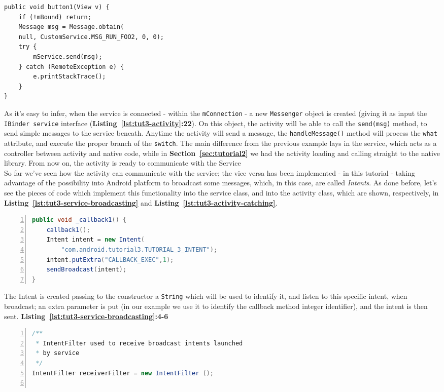 \documentclass[a4paper,10pt]{article}
\newcommand{\keyword}[1]{\texttt{#1}}
\newcommand{\refl}[1]{\textbf{Listing~\ref{#1}}}
\newcommand{\refs}[1]{\textbf{Section~\ref{#1}}}
\begin{document}
\begin{multicols}{2}
\begin{lstlisting}
public void button1(View v) {
	if (!mBound) return;
	Message msg = Message.obtain(
	null, CustomService.MSG_RUN_FOO2, 0, 0);
	try {
		mService.send(msg);
	} catch (RemoteException e) {
		e.printStackTrace();
	}
}
\end{lstlisting}
As it's easy to infer, when the service is connected - within the
\keyword{mConnection} - a new \keyword{Messenger} object is created (giving it
as input the \keyword{IBinder service} interface
(\refl{lst:tut3-activity}\textbf{:22}). On this object, the activity will be
able to call the \keyword{send(msg)} method, to send simple messages to the
service beneath. Anytime the activity will send a message, the
\keyword{handleMessage()} method will process the \keyword{what} attribute, and
execute the proper branch of the \keyword{switch}. The main difference from the
previous example lays in the service, which acts as a controller between
activity and native code, while in \refs{sec:tutorial2} we had the activity
loading and calling straight to the native library. From now on, the activity
is ready to communicate with the Service\\
So far we've seen how the activity can communicate with the service; the vice
versa has been implemented - in this tutorial - taking advantage of the
possibility into Android platform to broadcast some messages, which, in this
case, are called \textit{Intents}. As done before, let's see the pieces of code
which implement this functionality into the service class, and into the activity
class, which are shown, respectively, in \refl{lst:tut3-service-broadcasting}
and \refl{lst:tut3-activity-catching}.
\begin{lstlisting}[language=Java,
		   columns=fullflexible,
		   showstringspaces=false,
		   xleftmargin=15pt,
		   frame = l,
		   numbers=left,
		   commentstyle=\color{gray}\upshape,
		   caption=Tutorial3Service.java - intent broadcasting,
		   label=lst:tut3-service-broadcasting]
public void _callback1() {
	callback1();
	Intent intent = new Intent(
		"com.android.tutorial3.TUTORIAL_3_INTENT");
	intent.putExtra("CALLBACK_EXEC",1);
	sendBroadcast(intent);
}
\end{lstlisting}
The Intent is created passing to the constructor a \keyword{String} which will
be used to identify it, and listen to this specific intent, when broadcast; an
extra parameter is put (in our example we use it to identify the callback method
integer identifier), and the intent is then sent.
\refl{lst:tut3-service-broadcasting}\textbf{:4-6}
\begin{lstlisting}[language=Java,
		   columns=fullflexible,
		   showstringspaces=false,
		   xleftmargin=15pt,
		   frame = l,
		   numbers=left,
		   commentstyle=\color{gray}\upshape,
		   caption=Tutorial3Activity.java - intent catching,
		   label=lst:tut3-activity-catching]
/**
 * IntentFilter used to receive broadcast intents launched
 * by service
 */
IntentFilter receiverFilter = new IntentFilter ();


\end{lstlisting}
\end{multicols}
\end{document}
